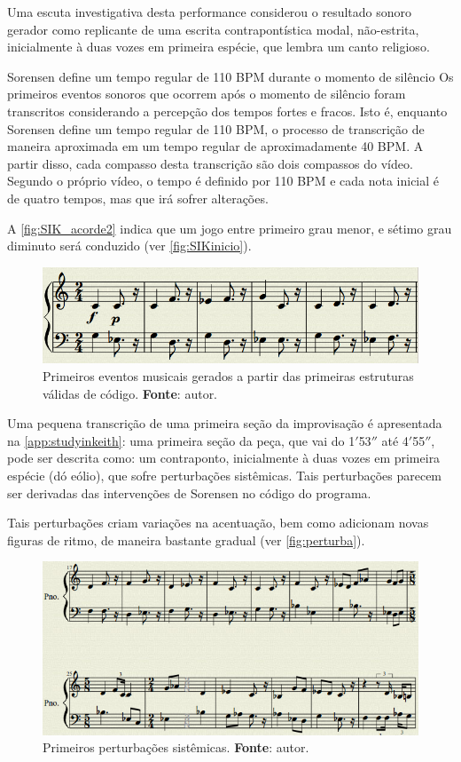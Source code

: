 Uma escuta investigativa desta performance considerou o resultado sonoro gerador como replicante de uma escrita contrapontística modal, não-estrita, inicialmente à duas vozes em primeira espécie, que lembra um canto religioso.

Sorensen define um tempo regular de 110 BPM durante o momento de silêncio Os primeiros eventos sonoros que ocorrem após o momento de silêncio foram transcritos considerando a percepção dos tempos fortes e fracos. Isto é, enquanto Sorensen define um tempo regular de 110 BPM, o processo de transcrição
de maneira aproximada em um tempo regular de aproximadamente 40 BPM. A partir disso, cada compasso desta transcrição são dois compassos do vídeo. Segundo o próprio vídeo, o tempo é definido por 110 BPM e cada nota inicial é de quatro tempos, mas que irá sofrer alterações. 

A \autoref{fig:SIK_acorde2} indica que um jogo entre primeiro grau menor, e sétimo grau diminuto será conduzido  (ver \autoref{fig:SIKinicio}).

\begin{figure}[!h]
  \centering
  \includegraphics[scale=0.5]{imagens/SIK_motivo.png}
  \caption{Primeiros eventos musicais gerados a partir das primeiras estruturas válidas de código. \textbf{Fonte}: autor.}
  \label{fig:SIKinicio}
\end{figure}

Uma pequena transcrição de uma primeira seção da improvisação é apresentada na \autoref{app:studyinkeith}: uma primeira seção da peça, que vai do 1$'$53$''$ até 4$'$55$''$, pode ser descrita como: um contraponto, inicialmente à duas vozes em primeira espécie (dó eólio), que sofre perturbações sistêmicas. Tais perturbações parecem ser derivadas das intervenções de Sorensen no código do programa.

Tais perturbações criam variações na acentuação, bem como adicionam novas figuras de ritmo, de maneira bastante gradual (ver \autoref{fig:perturba}).

\begin{figure}[!h]
  \centering
  \includegraphics[scale=0.5]{imagens/SIK_perturba.png}
  \caption{Primeiros perturbações sistêmicas. \textbf{Fonte}: autor.}
  \label{fig:SIKinicio}
\end{figure}

